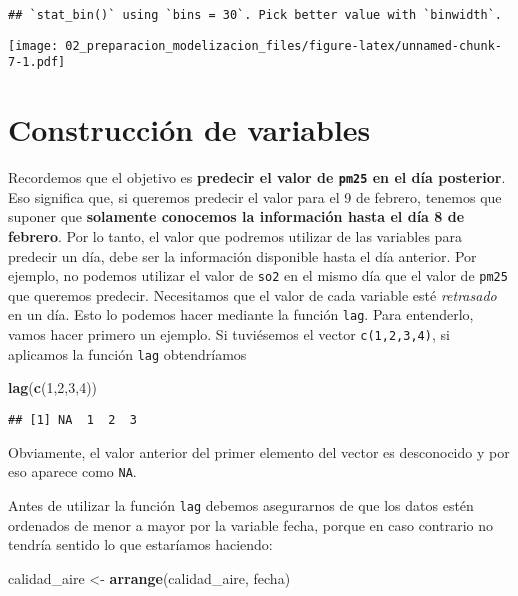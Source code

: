 \documentclass[]{article}
\newenvironment{Shaded}{\begin{snugshade}}{\end{snugshade}}
\newcommand{\DecValTok}[1]{\textcolor[rgb]{0.00,0.00,0.81}{#1}}
\newcommand{\KeywordTok}[1]{\textcolor[rgb]{0.13,0.29,0.53}{\textbf{#1}}}
\newcommand{\NormalTok}[1]{#1}
\newcommand{\StringTok}[1]{\textcolor[rgb]{0.31,0.60,0.02}{#1}}
\begin{document}
\begin{verbatim}
## `stat_bin()` using `bins = 30`. Pick better value with `binwidth`.
\end{verbatim}

\texttt{[image: 02\_preparacion\_modelizacion\_files/figure-latex/unnamed-chunk-7-1.pdf]}

\hypertarget{construcciuxf3n-de-variables}{%
\section{Construcción de variables}\label{construcciuxf3n-de-variables}}

Recordemos que el objetivo es \textbf{predecir el valor de \texttt{pm25}
en el día posterior}. Eso significa que, si queremos predecir el valor
para el 9 de febrero, tenemos que suponer que \textbf{solamente
conocemos la información hasta el día 8 de febrero}. Por lo tanto, el
valor que podremos utilizar de las variables para predecir un día, debe
ser la información disponible hasta el día anterior. Por ejemplo, no
podemos utilizar el valor de \texttt{so2} en el mismo día que el valor
de \texttt{pm25} que queremos predecir. Necesitamos que el valor de cada
variable esté \emph{retrasado} en un día. Esto lo podemos hacer mediante
la función \texttt{lag}. Para entenderlo, vamos hacer primero un
ejemplo. Si tuviésemos el vector \texttt{c(1,2,3,4)}, si aplicamos la
función \texttt{lag} obtendríamos

\begin{Shaded}
\begin{Highlighting}[]
\KeywordTok{lag}\NormalTok{(}\KeywordTok{c}\NormalTok{(}\DecValTok{1}\NormalTok{,}\DecValTok{2}\NormalTok{,}\DecValTok{3}\NormalTok{,}\DecValTok{4}\NormalTok{))}
\end{Highlighting}
\end{Shaded}

\begin{verbatim}
## [1] NA  1  2  3
\end{verbatim}

Obviamente, el valor anterior del primer elemento del vector es
desconocido y por eso aparece como \texttt{NA}.

Antes de utilizar la función \texttt{lag} debemos asegurarnos de que los
datos estén ordenados de menor a mayor por la variable fecha, porque en
caso contrario no tendría sentido lo que estaríamos haciendo:

\begin{Shaded}
\begin{Highlighting}[]
\NormalTok{calidad_aire <-}\StringTok{ }\KeywordTok{arrange}\NormalTok{(calidad_aire, fecha)}
\end{Highlighting}
\end{Shaded}
\end{document}
